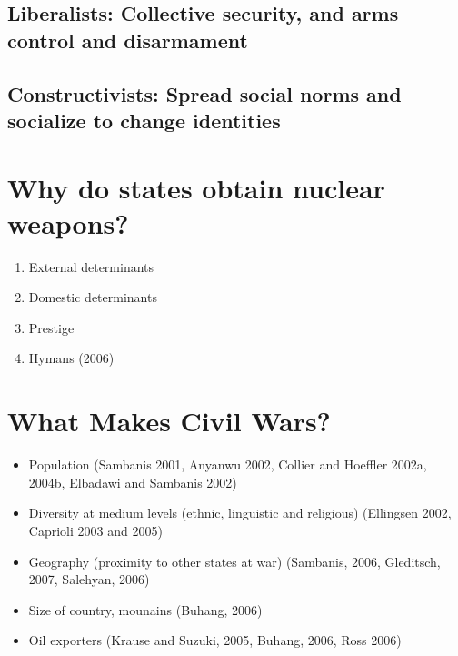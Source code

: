 \documentclass[
]{book}
\begin{document}
\hypertarget{liberalists-collective-security-and-arms-control-and-disarmament}{%
\subsection{Liberalists: Collective security, and arms control and disarmament}\label{liberalists-collective-security-and-arms-control-and-disarmament}}

\hypertarget{constructivists-spread-social-norms-and-socialize-to-change-identities}{%
\subsection{Constructivists: Spread social norms and socialize to change identities}\label{constructivists-spread-social-norms-and-socialize-to-change-identities}}

\hypertarget{why-do-states-obtain-nuclear-weapons}{%
\section{Why do states obtain nuclear weapons?}\label{why-do-states-obtain-nuclear-weapons}}

\begin{enumerate}
\def\labelenumi{\arabic{enumi}.}
\item
  External determinants
\item
  Domestic determinants
\item
  Prestige
\item
  Hymans (2006)
\end{enumerate}

\hypertarget{what-makes-civil-wars}{%
\section{What Makes Civil Wars?}\label{what-makes-civil-wars}}

\begin{itemize}
\item
  Population (Sambanis 2001, Anyanwu 2002, Collier and Hoeffler 2002a, 2004b, Elbadawi and Sambanis 2002)
\item
  Diversity at medium levels (ethnic, linguistic and religious) (Ellingsen 2002, Caprioli 2003 and 2005)
\item
  Geography (proximity to other states at war) (Sambanis, 2006, Gleditsch, 2007, Salehyan, 2006)
\item
  Size of country, mounains (Buhang, 2006)
\item
  Oil exporters (Krause and Suzuki, 2005, Buhang, 2006, Ross 2006)
\end{itemize}
\end{document}
